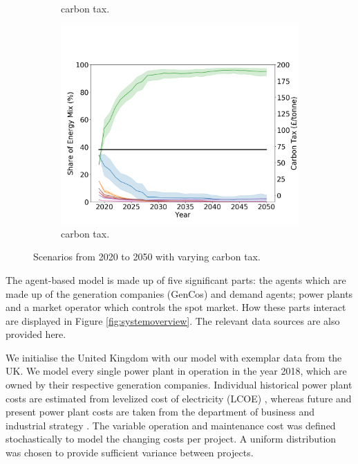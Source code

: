 \begin{figure}[h]
\begin{subfigure}[b]{0.33\textwidth}
		\caption[]%
		{ carbon tax.}
		\label{fig:demand99carbon20}
	\end{subfigure}
	\begin{subfigure}[b]{0.33\textwidth}
		\centering
		\includegraphics[width=\textwidth]{figures/scenarios/demand099-carbon70-datetime.png}
		\caption[Network2]%
		{\small {} carbon tax.}
		\label{fig:demand99carbon70}
	\end{subfigure}
	\caption{Scenarios from 2020 to 2050 with varying carbon tax.}
\end{figure}


The agent-based model is made up of five significant parts: the agents which are made up of the generation companies (GenCos) and demand agents; power plants and a market operator which controls the spot market. How these parts interact are displayed in Figure \ref{fig:systemoverview}. The relevant data sources are also provided here.

We initialise the United Kingdom with our model with exemplar data from the UK. We model every single power plant in operation in the year 2018, which are owned by their respective generation companies. Individual historical power plant costs are estimated from levelized cost of electricity (LCOE) \cite{Dale2013, IEA2015,IRENA2018}, whereas future and present power plant costs are taken from the department of business and industrial strategy \cite{Department2016}. The variable operation and maintenance cost was defined stochastically to model the changing costs per project. A uniform distribution was chosen to provide sufficient variance between projects.

